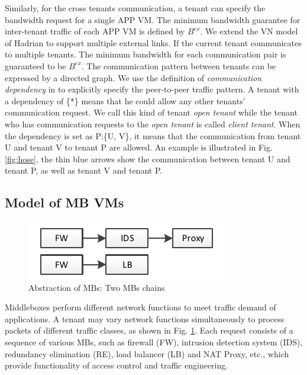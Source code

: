 \documentclass[review]{elsarticle}
\begin{document}
Similarly, for the cross tenants communication, a tenant can specify the bandwidth request for a single APP VM. The minimum bandwidth guarantee for inter-tenant traffic of each APP VM is defined by $B^{ex}$. We extend the VN model of Hadrian \cite{B13cta} to support multiple external links. If the current tenant communicates to multiple tenants. The minimum bandwidth for each communication pair is guaranteed to be $B^{ex}$. The communication pattern between tenants can be expressed by a directed graph. We use the definition of \emph{communication dependency} in \cite{B13cta} to explicitly specify the peer-to-peer traffic pattern. A tenant with a dependency of \{*\} means that he could allow any other tenants' communication request. We call this kind of tenant \emph{open tenant} while the tenant who has communication requests to the \emph{open tenant} is called \emph{client tenant}. When the dependency is set as P:\{U, V\}, it means that the communication from tenant U and tenant V to tenant P are allowed. An example is illustrated in Fig. \ref{fig:hose}, the thin blue arrows show the communication between tenant U and tenant P, as well as tenant V and tenant P.




\subsection{Model of MB VMs}\label{sec:modelformb}

\begin{figure}
	\centering
	\includegraphics[width=3.5 in]{fig/chain.pdf}
	\caption{Abstraction of MBs: Two MBs chains}
	\label{fig:chain}
\end{figure}

Middleboxes perform different network functions to meet traffic demand of applications. A tenant may vary network functions simultaneously to process packets of different traffic classes, as shown in Fig. \ref{fig:chain}. Each request consists of a sequence of various MBs, such as firewall (FW), intrusion detection system (IDS), redundancy elimination (RE), load balancer (LB) and NAT Proxy, etc., which provide functionality of access control and traffic engineering. 
\end{document}

